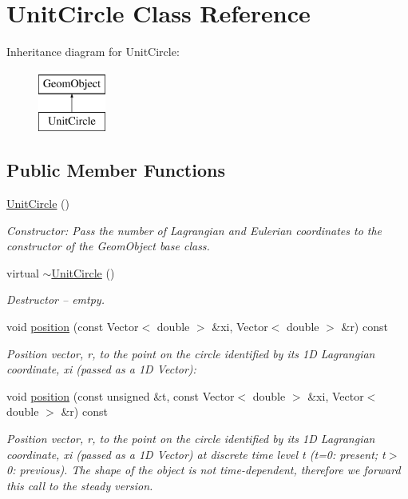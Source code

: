 \hypertarget{classUnitCircle}{}\section{Unit\+Circle Class Reference}
\label{classUnitCircle}
Inheritance diagram for Unit\+Circle\+:\begin{figure}[H]
\begin{center}
\leavevmode
\includegraphics[height=2.000000cm]{classUnitCircle}
\end{center}
\end{figure}
\subsection*{Public Member Functions}
\begin{DoxyCompactItemize}
\item 
\hyperlink{classUnitCircle_a494ddf1cb37b659c6f8c44ddde2b9b33}{Unit\+Circle} ()
\begin{DoxyCompactList}\small\item\em Constructor\+: Pass the number of Lagrangian and Eulerian coordinates to the constructor of the Geom\+Object base class. \end{DoxyCompactList}\item 
virtual \hyperlink{classUnitCircle_a9eb314d8152f5de298e1e155737a69b9}{$\sim$\+Unit\+Circle} ()
\begin{DoxyCompactList}\small\item\em Destructor -- emtpy. \end{DoxyCompactList}\item 
void \hyperlink{classUnitCircle_adc7fc660ba1d2ecc5bcbe2312e2fb87b}{position} (const Vector$<$ double $>$ \&xi, Vector$<$ double $>$ \&r) const
\begin{DoxyCompactList}\small\item\em Position vector, r, to the point on the circle identified by its 1D Lagrangian coordinate, xi (passed as a 1D Vector)\+: \end{DoxyCompactList}\item 
void \hyperlink{classUnitCircle_aef5327f81f396de4ecbf8c0aa7de08d3}{position} (const unsigned \&t, const Vector$<$ double $>$ \&xi, Vector$<$ double $>$ \&r) const
\begin{DoxyCompactList}\small\item\em Position vector, r, to the point on the circle identified by its 1D Lagrangian coordinate, xi (passed as a 1D Vector) at discrete time level t (t=0\+: present; t$>$0\+: previous). The shape of the object is not time-\/dependent, therefore we forward this call to the steady version. \end{DoxyCompactList}\end{DoxyCompactItemize}


